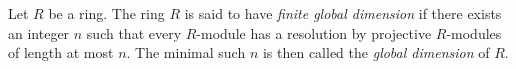 \begin{definition}
\label{definition-finite-gl-dim}
Let $R$ be a ring. The ring
$R$ is said to have {\it finite global dimension}
if there exists an integer $n$ such that
every $R$-module has a resolution by
projective $R$-modules of length at most $n$.
The minimal such $n$ is then called the {\it global dimension}
of $R$.
\end{definition}